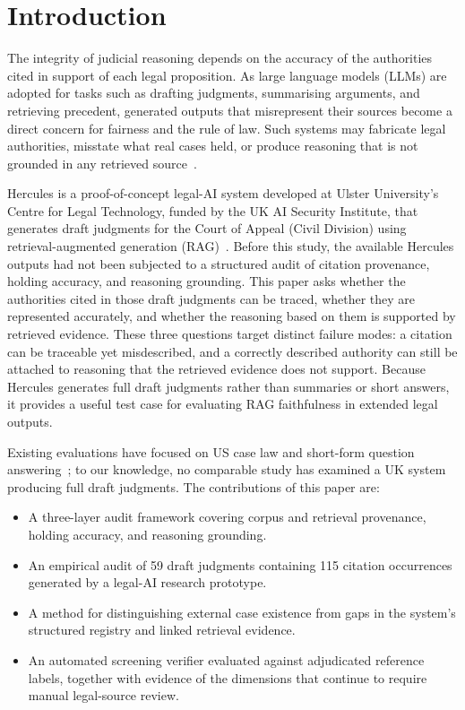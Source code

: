 \documentclass[conference]{IEEEtran}
\begin{document}
\section{Introduction}

The integrity of judicial reasoning depends on the accuracy of the authorities cited in support of each legal proposition. As large language models (LLMs) are adopted for tasks such as drafting judgments, summarising arguments, and retrieving precedent, generated outputs that misrepresent their sources become a direct concern for fairness and the rule of law. Such systems may fabricate legal authorities, misstate what real cases held, or produce reasoning that is not grounded in any retrieved source~\cite{magesh2024}.

Hercules is a proof-of-concept legal-AI system developed at Ulster University's Centre for Legal Technology, funded by the UK AI Security Institute, that generates draft judgments for the Court of Appeal (Civil Division) using retrieval-augmented generation (RAG)~\cite{hercules}. Before this study, the available Hercules outputs had not been subjected to a structured audit of citation provenance, holding accuracy, and reasoning grounding. This paper asks whether the authorities cited in those draft judgments can be traced, whether they are represented accurately, and whether the reasoning based on them is supported by retrieved evidence. These three questions target distinct failure modes: a citation can be traceable yet misdescribed, and a correctly described authority can still be attached to reasoning that the retrieved evidence does not support. Because Hercules generates full draft judgments rather than summaries or short answers, it provides a useful test case for evaluating RAG faithfulness in extended legal outputs.

Existing evaluations have focused on US case law and short-form question answering~\cite{magesh2024}; to our knowledge, no comparable study has examined a UK system producing full draft judgments. The contributions of this paper are:

\begin{itemize}
\item A three-layer audit framework covering corpus and retrieval provenance, holding accuracy, and reasoning grounding.
\item An empirical audit of 59 draft judgments containing 115 citation occurrences generated by a legal-AI research prototype.
\item A method for distinguishing external case existence from gaps in the system's structured registry and linked retrieval evidence.
\item An automated screening verifier evaluated against adjudicated reference labels, together with evidence of the dimensions that continue to require manual legal-source review.
\end{itemize}
\end{document}
